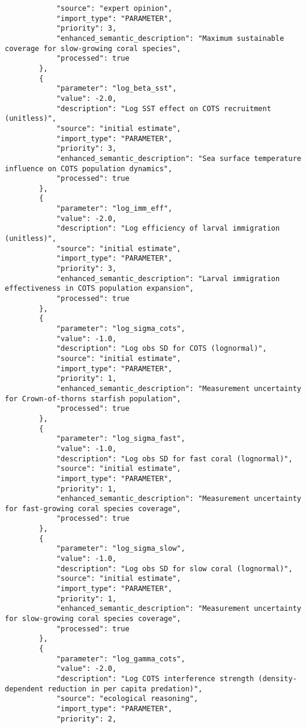 \begin{lstlisting}
            "source": "expert opinion",
            "import_type": "PARAMETER",
            "priority": 3,
            "enhanced_semantic_description": "Maximum sustainable coverage for slow-growing coral species",
            "processed": true
        },
        {
            "parameter": "log_beta_sst",
            "value": -2.0,
            "description": "Log SST effect on COTS recruitment (unitless)",
            "source": "initial estimate",
            "import_type": "PARAMETER",
            "priority": 3,
            "enhanced_semantic_description": "Sea surface temperature influence on COTS population dynamics",
            "processed": true
        },
        {
            "parameter": "log_imm_eff",
            "value": -2.0,
            "description": "Log efficiency of larval immigration (unitless)",
            "source": "initial estimate",
            "import_type": "PARAMETER",
            "priority": 3,
            "enhanced_semantic_description": "Larval immigration effectiveness in COTS population expansion",
            "processed": true
        },
        {
            "parameter": "log_sigma_cots",
            "value": -1.0,
            "description": "Log obs SD for COTS (lognormal)",
            "source": "initial estimate",
            "import_type": "PARAMETER",
            "priority": 1,
            "enhanced_semantic_description": "Measurement uncertainty for Crown-of-thorns starfish population",
            "processed": true
        },
        {
            "parameter": "log_sigma_fast",
            "value": -1.0,
            "description": "Log obs SD for fast coral (lognormal)",
            "source": "initial estimate",
            "import_type": "PARAMETER",
            "priority": 1,
            "enhanced_semantic_description": "Measurement uncertainty for fast-growing coral species coverage",
            "processed": true
        },
        {
            "parameter": "log_sigma_slow",
            "value": -1.0,
            "description": "Log obs SD for slow coral (lognormal)",
            "source": "initial estimate",
            "import_type": "PARAMETER",
            "priority": 1,
            "enhanced_semantic_description": "Measurement uncertainty for slow-growing coral species coverage",
            "processed": true
        },
        {
            "parameter": "log_gamma_cots",
            "value": -2.0,
            "description": "Log COTS interference strength (density-dependent reduction in per capita predation)",
            "source": "ecological reasoning",
            "import_type": "PARAMETER",
            "priority": 2,

\end{lstlisting}
